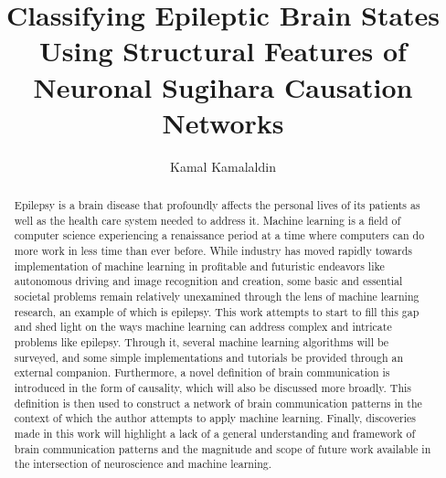 \documentclass[journal,12pt,onecolumn,draftclsnofoot]{IEEEtran}  %
\title{Classifying Epileptic Brain States Using Structural Features of Neuronal Sugihara Causation Networks}
\author{Kamal Kamalaldin}
\begin{document}
\maketitle

\thispagestyle{empty}
\cleardoublepage

\tableofcontents

\thispagestyle{empty}
\cleardoublepage


\begin{abstract}
Epilepsy is a brain disease that profoundly affects the personal lives of its patients as well as the health care system needed to address it. Machine learning is a field of computer science experiencing a renaissance period at a time where computers can do more work in less time than ever before. While industry has moved rapidly towards  implementation of machine learning in profitable and futuristic endeavors like autonomous driving and image recognition and creation, some basic and essential societal problems remain relatively unexamined through the lens of machine learning research, an example of which is epilepsy. This work attempts to start to fill this gap and shed light on the ways machine learning can address complex and intricate problems like epilepsy. Through it, several machine learning algorithms will be surveyed, and some simple implementations and tutorials be provided through an external companion. Furthermore, a novel definition of brain communication is introduced in the form of causality, which will also be discussed more broadly. This definition is then used to construct a network of brain communication patterns in the context of which the author attempts to apply machine learning. Finally, discoveries made in this work will highlight a lack of a general understanding and framework of brain communication patterns and the magnitude and scope of future work available in the intersection of neuroscience and machine learning.
\end{abstract}


\clearpage

\clearpage



\clearpage

\clearpage

\end{document}

